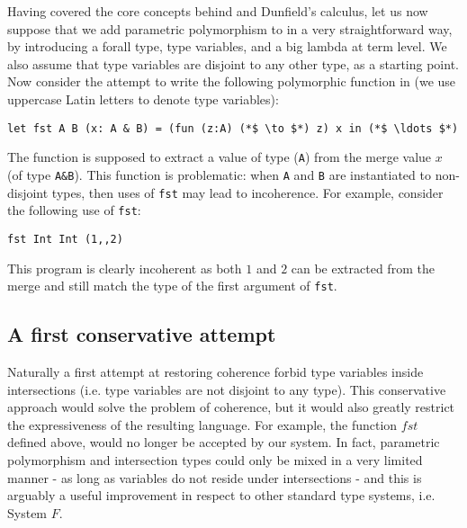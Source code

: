 Having covered the core concepts behind \oldname and Dunfield's calculus,
let us now suppose that we add parametric polymorphism to \oldname in a very straightforward 
way, by introducing a forall type, type variables, and a big lambda at term level.
We also assume that type variables are disjoint to any other type, as a starting point.
Now consider the attempt to write the following polymorphic function in \name (we use
uppercase Latin letters to denote type variables):
\begin{lstlisting}
let fst A B (x: A & B) = (fun (z:A) (*$ \to $*) z) x in (*$ \ldots $*)
\end{lstlisting}
The  function is supposed to extract a value of type
(\lstinline{A}) from the merge value $x$ (of type \lstinline{A&B}). 
This function is problematic: when
\lstinline{A} and \lstinline{B} are instantiated to non-disjoint
types, then uses of \lstinline{fst} may lead to incoherence.
For example, consider the following use of \lstinline{fst}:
\begin{lstlisting}
fst Int Int (1,,2)
\end{lstlisting}
\noindent This program is clearly incoherent as both
$1$ and $2$ can be extracted from the merge and still match the type
of the first argument of \lstinline{fst}.

\subsection{A first conservative attempt}

Naturally a first attempt at restoring coherence forbid type variables inside
intersections (i.e. type variables are not disjoint to any type).
This conservative approach would solve the problem of coherence, but it would also greatly 
restrict the expressiveness of the resulting language.
For example, the function $fst$ defined above, would no longer be accepted by our system.
In fact, parametric polymorphism and intersection types could only be mixed in a very limited manner -
as long as variables do not reside under intersections - and this is arguably a useful improvement
in respect to other standard type systems, i.e. System $F$.

